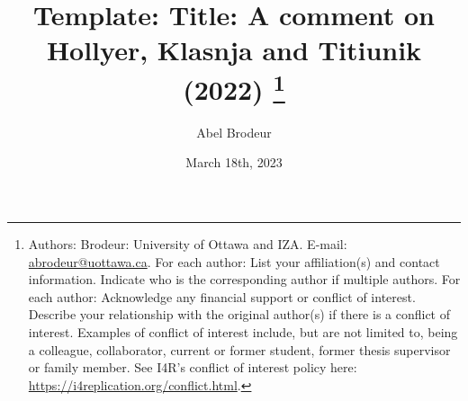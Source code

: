 \documentclass[12pt,a4paper]{article}
\begin{document}
\date{March 18th, 2023}

\title{Template: Title: A comment on Hollyer, Klasnja and Titiunik (2022) \thanks{Authors: 
Brodeur: University of Ottawa and IZA. E-mail: \href{mailto:abrodeur@uottawa.ca}%
{abrodeur@uottawa.ca}. For each author: List your affiliation(s) and contact information. Indicate who is the corresponding author if multiple authors. For each author: Acknowledge any financial support or conflict of interest. Describe your relationship with the original author(s) if there is a conflict of interest. Examples of conflict of interest include, but are not limited to, being a colleague, collaborator, current or former student, former thesis supervisor or family member. See I4R’s conflict of interest policy here: \url{https://i4replication.org/conflict.html}.}}
\author{Abel Brodeur}

\maketitle
\end{document}
